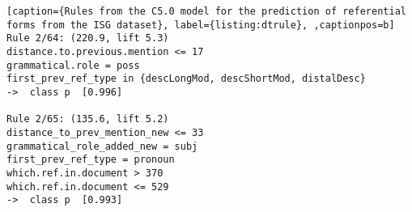\begin{lstlisting}[caption={Rules from the C5.0 model for the prediction of referential forms from the ISG dataset}, label={listing:dtrule}, ,captionpos=b]
Rule 2/64: (220.9, lift 5.3)
distance.to.previous.mention <= 17
grammatical.role = poss
first_prev_ref_type in {descLongMod, descShortMod, distalDesc}
->  class p  [0.996]

Rule 2/65: (135.6, lift 5.2)
distance_to_prev_mention_new <= 33
grammatical_role_added_new = subj
first_prev_ref_type = pronoun
which.ref.in.document > 370
which.ref.in.document <= 529
->  class p  [0.993]
\end{lstlisting}
